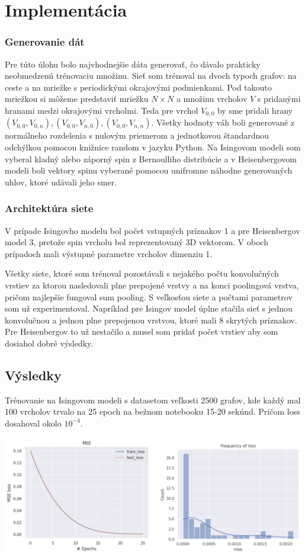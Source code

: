 \documentclass{article}
\begin{document}
\section*{Implementácia}
\subsubsection*{Generovanie dát}
Pre túto úlohu bolo najvhodnejšie dáta generovať, čo dávalo prakticky neobmedzenú trénovaciu množinu. Sieť som trénoval na dvoch typoch grafov: na ceste a na mriežke s periodickými okrajovými podmienkami. Pod takouto mriežkou si môžeme predstaviť mriežku $N \times N$ a množinu vrcholov $V$ s pridanými hranami medzi okrajovými vrcholmi. Teda pre vrchol $V_{0,0}$ by sme pridali hrany $(V_{0, 0}, V_{0, n}), (V_{0, 0}, V_{n, 0}), (V_{0, 0}, V_{n, n})$. Všetky hodnoty váh boli generované z normálneho rozdelenia s nulovým priemerom a jednotkovou štandardnou odchýlkou pomocou knižnice random v jazyku Python. Na Isingovom modeli som vyberal kladný alebo záporný spin z Bernoulliho distribúcie a v Heisenbergovom modeli boli vektory spinu vyberané pomocou unifromne náhodne generovaných uhlov, ktoré udávali jeho smer.


\subsubsection*{Architektúra siete}
V prípade Isingovho modelu bol počet vstupných príznakov 1 a pre Heisenbergov model 3, pretože spin vrcholu bol reprezentovaný 3D vektorom. V oboch prípadoch mali výstupné parametre vrcholov dimenziu 1. 

Všetky siete, ktoré som trénoval pozostávali s nejakého počtu konvolučných vrstiev za ktorou nasledovali plne prepojené vrstvy a na konci poolingová vrstva, pričom najlepšie fungoval sum pooling. S veľkosťou siete a počtami parametrov som už experimentoval. Napríklad pre Isingov model úplne stačila sieť s jednou konvolučnou a jednou plne prepojenou vrstvou, ktoré mali 8 skrytých príznakov. Pre Heisenbergov to už nestačilo a musel som pridať počet vrstiev aby som dosiahol dobré výsledky.  

\subsection*{Výsledky}
Trénovanie na Isingovom modeli s datasetom veľkosti 2500 grafov, kde každý mal 100 vrcholov trvalo na 25 epoch na bežnom notebooku 15-20 sekúnd. Pričom loss dosahoval okolo $10^{-4}$.
\begin{center}
    \includegraphics*[scale=0.2]{ising_path.png}
\end{center}
\end{document}
